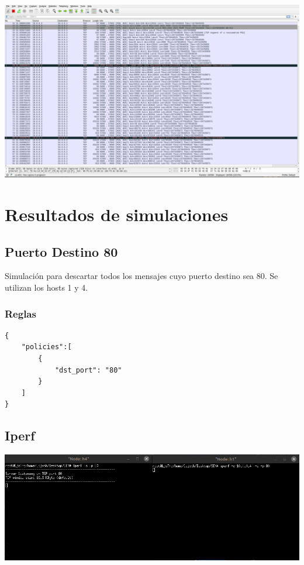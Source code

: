 \documentclass{article}
\begin{document}
\begin{center}
\includegraphics[scale=0.2]{iperfTCP.png}

\end{center}

\section{Resultados de simulaciones}\label{pruebas-wip}

\subsection{Puerto Destino 80}
Simulación para descartar todos los mensajes cuyo puerto destino sea 80. Se utilizan los hosts 1 y 4. 

\subsubsection{Reglas}
\begin{verbatim}
{
    "policies":[
        {
            "dst_port": "80"
        }
    ]
}
\end{verbatim}

\subsection{Iperf}
\begin{center}
\includegraphics[scale=0.35]{iperf_port_80.png}
\end{center}
\end{document}
